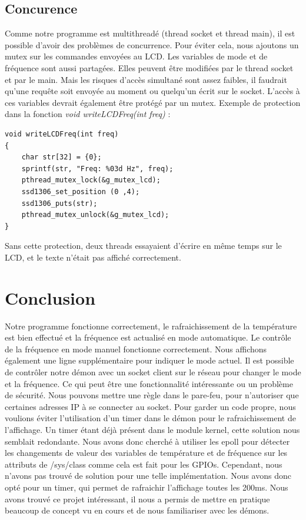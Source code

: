 \documentclass[
	a4paper, %
	10pt, %
]{CSUniSchoolLabReport}
\begin{document}
\newpage
\subsection{Concurence}
Comme notre programme est multithreadé (thread socket et thread main), il est possible d'avoir des problèmes de concurrence. Pour éviter cela, nous ajoutons un mutex sur les commandes envoyées au LCD.
Les variables de mode et de fréquence sont aussi partagées. Elles peuvent être modifiées par le thread socket et par le main. Mais les risques d'accès simultané sont assez faibles, il faudrait qu'une requête soit envoyée au moment ou quelqu'un écrit sur le socket. L'accès à ces variables devrait également être protégé par un mutex.
Exemple de protection dans la fonction \textit{void writeLCDFreq(int freq)} : \\
\begin{lstlisting}[style=CStyle]
void writeLCDFreq(int freq)
{
    char str[32] = {0};
    sprintf(str, "Freq: %03d Hz", freq);
    pthread_mutex_lock(&g_mutex_lcd);
    ssd1306_set_position (0 ,4);
    ssd1306_puts(str);
    pthread_mutex_unlock(&g_mutex_lcd);
}
\end{lstlisting}
Sans cette protection, deux threads essayaient d'écrire en même temps sur le LCD, et le texte n'était pas affiché correctement.

\section{Conclusion}

Notre programme fonctionne correctement, le rafraichissement de la température est bien effectué et la fréquence est actualisé en mode automatique.
Le contrôle de la fréquence en mode manuel fonctionne correctement. Nous affichons également une ligne supplémentaire pour indiquer le mode actuel.
Il est possible de contrôler notre démon avec un socket client sur le réseau pour changer le mode et la fréquence. Ce qui peut être une fonctionnalité intéressante ou un problème de sécurité. Nous pouvons mettre une règle dans le pare-feu, pour n'autoriser que certaines adresses IP à se connecter au socket.
\linebreak
\linebreak
Pour garder un code propre, nous voulions éviter l'utilisation d'un timer dans le démon pour le rafraichissement de l'affichage. Un timer étant déjà présent dans le module kernel, cette solution nous semblait redondante. Nous avons donc cherché à utiliser les epoll pour détecter les changements de valeur des variables de température et de fréquence sur les attributs de /sys/class comme cela est fait pour les GPIOs. Cependant, nous n'avons pas trouvé de solution pour une telle implémentation. Nous avons donc opté pour un timer, qui permet de rafraichir l'affichage toutes les 200ms.
Nous avons trouvé ce projet intéressant, il nous a permis de mettre en pratique beaucoup de concept vu en cours et de nous familiariser avec les démons.
\end{document}
